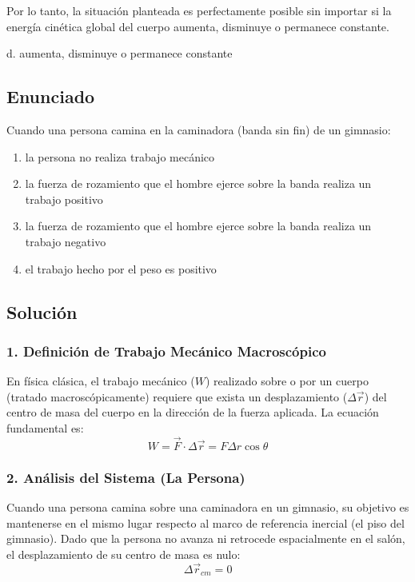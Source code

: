 \documentclass[12pt, a4paper]{article}
\begin{document}
Por lo tanto, la situación planteada es perfectamente posible sin importar si la energía cinética global del cuerpo aumenta, disminuye o permanece constante.

\begin{tcolorbox}[colback=green!5!white, colframe=green!50!black, title=Respuesta Correcta]
\centering \Large d. aumenta, disminuye o permanece constante
\end{tcolorbox}

\newpage

\subsection*{Enunciado}
Cuando una persona camina en la caminadora (banda sin fin) de un gimnasio:
\begin{enumerate}[label=\alph*.]
    \item la persona no realiza trabajo mecánico
    \item la fuerza de rozamiento que el hombre ejerce sobre la banda realiza un trabajo positivo
    \item la fuerza de rozamiento que el hombre ejerce sobre la banda realiza un trabajo negativo
    \item el trabajo hecho por el peso es positivo
\end{enumerate}

\subsection*{Solución}

\subsubsection*{1. Definición de Trabajo Mecánico Macroscópico}
En física clásica, el trabajo mecánico ($W$) realizado sobre o por un cuerpo (tratado macroscópicamente) requiere que exista un desplazamiento ($\Delta\vec{r}$) del centro de masa del cuerpo en la dirección de la fuerza aplicada. La ecuación fundamental es:
$$W = \vec{F} \cdot \Delta\vec{r} = F \Delta r \cos\theta$$

\subsubsection*{2. Análisis del Sistema (La Persona)}
Cuando una persona camina sobre una caminadora en un gimnasio, su objetivo es mantenerse en el mismo lugar respecto al marco de referencia inercial (el piso del gimnasio). 
Dado que la persona no avanza ni retrocede espacialmente en el salón, el desplazamiento de su centro de masa es nulo:
$$\Delta\vec{r}_{cm} = 0$$
\end{document}
